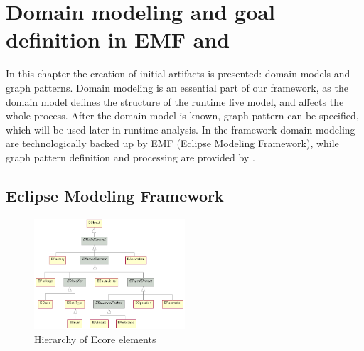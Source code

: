 \chapter{Domain modeling and goal definition in EMF and \viatra{}}

In this chapter the creation of initial artifacts is presented: domain models and graph patterns.
Domain modeling is an essential part of our framework, as the domain model defines the structure of the runtime live model, and affects the whole process. 
After the domain model is known, graph pattern can be specified, which will be used later in runtime analysis.
In the framework domain modeling are technologically backed up by EMF (Eclipse Modeling Framework), 
while graph pattern definition and processing are provided by \viatra{}.

\section{Eclipse Modeling Framework}


\begin{figure}
	\begin{center}
		\includegraphics[width=0.5\textwidth]{figures/EcoreHierarchy.png}
		\caption{Hierarchy of Ecore elements}
		\label{fig:ecore-hierarchy}
	\end{center}
\end{figure}

